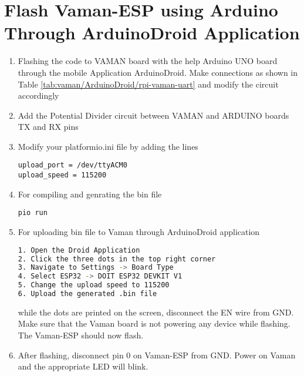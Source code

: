 \documentclass[12pt]{article}
\begin{document}
\fi

\section{Flash Vaman-ESP using Arduino Through ArduinoDroid Application}

\renewcommand{\theequation}{\theenumi}
\renewcommand{\thefigure}{\theenumi}
\begin{enumerate}[label=\thesubsection.\arabic*.,ref=\thesubsection.\theenumi]
\item Flashing the code to VAMAN board with the help Arduino UNO board through the mobile Application ArduinoDroid. Make connections as shown in Table \ref{tab:vaman/ArduinoDroid/rpi-vaman-uart} and modify the circuit accordingly
			\begin{table}[!h]
		
		\caption{}
		\label{tab:vaman/ArduinoDroid/rpi-vaman-uart}
	\end{table}
\item Add the Potential Divider circuit between VAMAN and ARDUINO boards TX and RX pins
\item Modify your platformio.ini file by adding the lines
\begin{lstlisting}
upload_port = /dev/ttyACM0
upload_speed = 115200
\end{lstlisting}

\item For compiling and genrating the bin file 
\begin{lstlisting}
pio run
\end{lstlisting}
\item For uploading bin file to Vaman through ArduinoDroid application 
\begin{lstlisting}[language=bash]
1. Open the Droid Application
2. Click the three dots in the top right corner
3. Navigate to Settings -> Board Type
4. Select ESP32 -> DOIT ESP32 DEVKIT V1
5. Change the upload speed to 115200
6. Upload the generated .bin file
\end{lstlisting}
while the dots are printed on the screen, disconnect the EN wire from GND.   Make sure that the Vaman board is not powering any device while flashing.  The Vaman-ESP should now flash.
\item After flashing, disconnect pin 0 on Vaman-ESP from GND. Power on Vaman and the appropriate LED will blink.
\end{enumerate}
\end{document}
